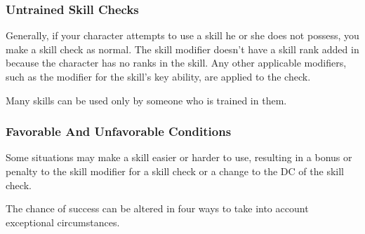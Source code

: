 \subsubsection{Untrained Skill Checks}
Generally, if your character attempts to use a skill he or she does not possess, you make a skill check as normal. The skill modifier doesn't have a skill rank added in because the character has no ranks in the skill. Any other applicable modifiers, such as the modifier for the skill's key ability, are applied to the check.

Many skills can be used only by someone who is trained in them.

\subsubsection{Favorable And Unfavorable Conditions}
Some situations may make a skill easier or harder to use, resulting in a bonus or penalty to the skill modifier for a skill check or a change to the DC of the skill check.


The chance of success can be altered in four ways to take into account exceptional circumstances.


